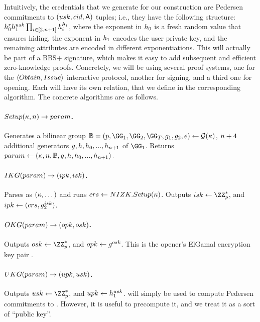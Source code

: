 Intuitively, the credentials that we generate for our \GSAC construction are
Pedersen commitments to $(usk,cid,\mathsf{A})$ tuples; i.e., they have
the following structure: $h_0^rh_1^{usk}\prod_{i \in [2,n+1]}
h_i^{\mathsf{A}_i}$, where the exponent in $h_0$ is a fresh random value
that ensures hiding, the exponent in $h_1$ encodes the user private
key, and the remaining attributes are encoded in different
exponentiations. This will actually be part of a BBS+ signature, which makes it
easy to add subsequent and efficient zero-knowledge proofs. Concretely, we will
be using several \NIZK proof systems, one for the $\langle Obtain,Issue
\rangle$ interactive protocol, another for signing, and a third one for opening.
Each will have its own relation, that we define in the corresponding algorithm.
The concrete algorithms are as follows.

\paragraph{$Setup(\kappa,n) \rightarrow param$.} %
Generates a bilinear group $\BB = (p,\GG_1,\GG_2,\GG_T,\gen{g}_1,\gen{g}_2,e) \gets
\PGen(\secpar)$, $n+4$ additional generators $g,h,h_0,...,
h_{n+1}$ of $\GG_1$. Returns $param \gets
(\kappa,n,\mathbb{B},g,h,h_0,...,h_{n+1})$.

\paragraph{$IKG(param) \rightarrow (ipk,isk)$.} %
Parses \parm as $(\kappa,\dots)$ and runs $crs \gets NIZK.Setup(\kappa)$.
Outputs $\isk \gets \ZZ^*_p$, and $ipk \gets (crs,g_2^{isk})$.

\paragraph{$OKG(param) \rightarrow (opk,osk)$.} %
Outputs $\osk \gets \ZZ^*_p$, and $opk \gets g^{osk}$. This is the
opener's ElGamal encryption key pair \needcite.

\paragraph{$UKG(param) \rightarrow (upk,usk)$.} %
Outputs $\usk \gets \ZZ^*_p$, and $upk \gets h_1^{usk}$. \upk will
simply be used to compute Pedersen commitments \needcite to \usk. However,
it is useful to precompute it, and we treat it as a sort of ``public key''.

